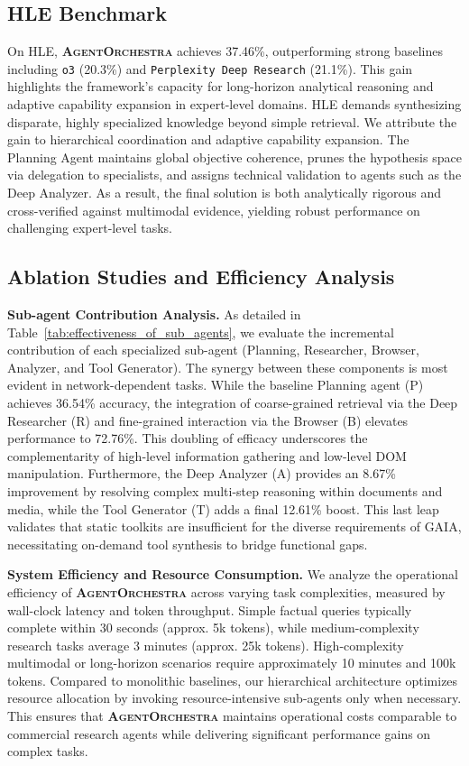 \documentclass[11pt]{article}
\newcommand{\projectname}{\textbf{\textsc{AgentOrchestra}}\xspace}
\begin{document}
\subsection{HLE Benchmark}
On HLE, \projectname achieves 37.46\%, outperforming strong baselines including \texttt{o3} (20.3\%) and \texttt{Perplexity Deep Research} (21.1\%). This gain highlights the framework's capacity for long-horizon analytical reasoning and adaptive capability expansion in expert-level domains. HLE demands synthesizing disparate, highly specialized knowledge beyond simple retrieval. We attribute the gain to hierarchical coordination and adaptive capability expansion. The Planning Agent maintains global objective coherence, prunes the hypothesis space via delegation to specialists, and assigns technical validation to agents such as the Deep Analyzer. As a result, the final solution is both analytically rigorous and cross-verified against multimodal evidence, yielding robust performance on challenging expert-level tasks.

\subsection{Ablation Studies and Efficiency Analysis}

\textbf{Sub-agent Contribution Analysis.} As detailed in Table~\ref{tab:effectiveness_of_sub_agents}, we evaluate the incremental contribution of each specialized sub-agent (Planning, Researcher, Browser, Analyzer, and Tool Generator). The synergy between these components is most evident in network-dependent tasks. While the baseline Planning agent (P) achieves 36.54\% accuracy, the integration of coarse-grained retrieval via the Deep Researcher (R) and fine-grained interaction via the Browser (B) elevates performance to 72.76\%. This doubling of efficacy underscores the complementarity of high-level information gathering and low-level DOM manipulation. Furthermore, the Deep Analyzer (A) provides an 8.67\% improvement by resolving complex multi-step reasoning within documents and media, while the Tool Generator (T) adds a final 12.61\% boost. This last leap validates that static toolkits are insufficient for the diverse requirements of GAIA, necessitating on-demand tool synthesis to bridge functional gaps.

\textbf{System Efficiency and Resource Consumption.} We analyze the operational efficiency of \projectname across varying task complexities, measured by wall-clock latency and token throughput. Simple factual queries typically complete within 30 seconds (approx. 5k tokens), while medium-complexity research tasks average 3 minutes (approx. 25k tokens). High-complexity multimodal or long-horizon scenarios require approximately 10 minutes and 100k tokens. Compared to monolithic baselines, our hierarchical architecture optimizes resource allocation by invoking resource-intensive sub-agents only when necessary. This ensures that \projectname maintains operational costs comparable to commercial research agents while delivering significant performance gains on complex tasks.
\end{document}
